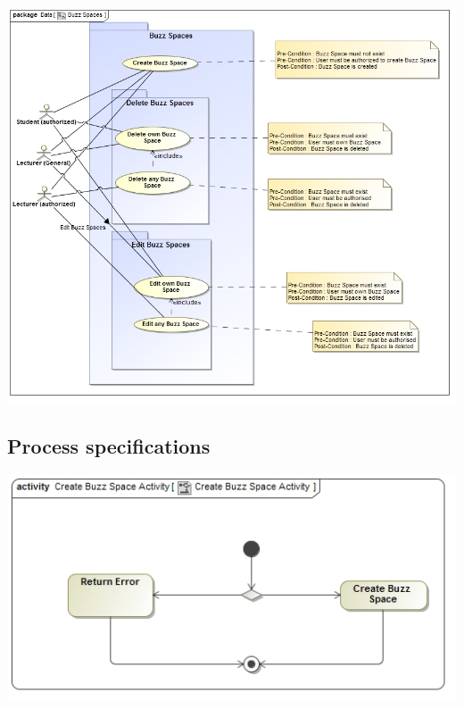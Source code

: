 \documentclass[12pt, oneside]{article}
\begin{document}
\begin{center}
			 \includegraphics[scale=0.55]{"Buzz Spaces"}
			 
			 
	\end{center}
	\newpage		 
	\subsection{Process specifications}
		\includegraphics[scale=0.55]{Activity_Diagram__Create_Buzz_Space_Activity__Create_Buzz_Space_Activity}\newline
		
\end{document}
